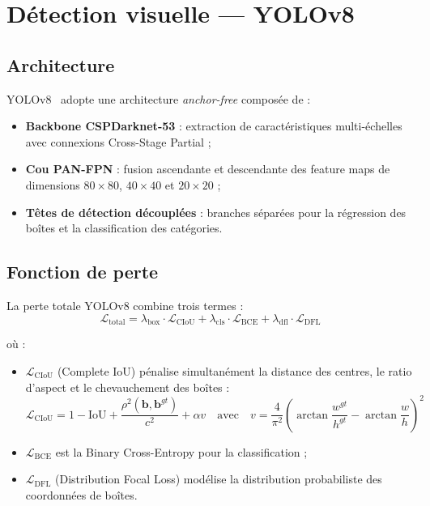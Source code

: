\section{Détection visuelle — YOLOv8}

\subsection{Architecture}

YOLOv8~\cite{yolov8_2023} adopte une architecture \textit{anchor-free} composée de :
\begin{itemize}
  \item \textbf{Backbone CSPDarknet-53} : extraction de caractéristiques
        multi-échelles avec connexions Cross-Stage Partial ;
  \item \textbf{Cou PAN-FPN} : fusion ascendante et descendante des feature maps
        de dimensions $80\times80$, $40\times40$ et $20\times20$ ;
  \item \textbf{Têtes de détection découplées} : branches séparées pour la
        régression des boîtes et la classification des catégories.
\end{itemize}

\subsection{Fonction de perte}

La perte totale YOLOv8 combine trois termes :
\begin{equation}
\mathcal{L}_\text{total} = \lambda_\text{box}\cdot\mathcal{L}_\text{CIoU}
  + \lambda_\text{cls}\cdot\mathcal{L}_\text{BCE}
  + \lambda_\text{dfl}\cdot\mathcal{L}_\text{DFL}
\label{eq:yolo_loss}
\end{equation}

où :
\begin{itemize}
  \item $\mathcal{L}_\text{CIoU}$ (Complete IoU) pénalise simultanément la distance
        des centres, le ratio d'aspect et le chevauchement des boîtes :
  \begin{equation}
  \mathcal{L}_\text{CIoU} = 1 - \text{IoU} + \frac{\rho^2(\mathbf{b}, \mathbf{b}^{gt})}{c^2}
    + \alpha v
  \quad\text{avec}\quad
  v = \frac{4}{\pi^2}\left(\arctan\frac{w^{gt}}{h^{gt}} - \arctan\frac{w}{h}\right)^2
  \label{eq:ciou}
  \end{equation}
  \item $\mathcal{L}_\text{BCE}$ est la Binary Cross-Entropy pour la classification ;
  \item $\mathcal{L}_\text{DFL}$ (Distribution Focal Loss) modélise la distribution
        probabiliste des coordonnées de boîtes.
\end{itemize}

